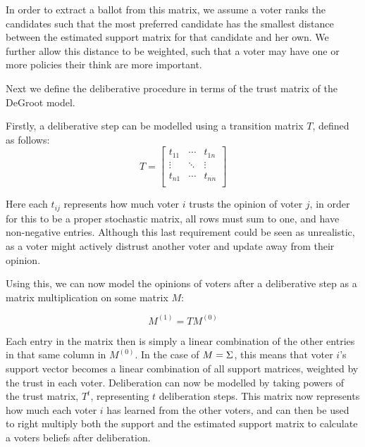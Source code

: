 In order to extract a ballot from this matrix, we assume a voter ranks the
candidates such that the most preferred candidate has the smallest distance
between the estimated support matrix for that candidate and her own. We
further allow this distance to be weighted, such that a voter may have one or
more policies their think are more important.


Next we define the deliberative procedure in terms of the trust matrix of the
DeGroot model.

Firstly, a deliberative step can be modelled using a transition matrix $T$,
defined as follows: \[ T=\begin{bmatrix} t_{11} & \cdots & t_{1n} \\ \vdots &
                \ddots & \vdots          \\ t_{n1} & \cdots  & t_{nn} \\\end{bmatrix} \]

Here each $t_{ij}$ represents how much voter $i$ trusts the opinion of voter
$j$, in order for this to be a proper stochastic matrix, all rows must sum to
one, and have non-negative entries. Although this last requirement could be
seen as unrealistic, as a voter might actively distrust another voter and
update away from their opinion.

Using this, we can now model the opinions of voters after a deliberative step
as a matrix multiplication on some matrix $M$:

\begin{equation} M^{(1)} = TM^{(0)} \label{eq:update_degroot} \end{equation}

Each entry in the matrix then is simply a linear combination of the other
entries in that same column in $M^{(0)}$. In the case of $M = \Sigma$,
this means that voter $i$'s support vector becomes a linear combination of all
support matrices, weighted by the trust in each voter. Deliberation can now be
modelled by taking powers of the trust matrix, $T^{t}$, representing $t$
deliberation steps. This matrix now represents how much each voter $i$ has
learned from the other voters, and can then be used to right multiply both the
support and the estimated support matrix to calculate a voters beliefs after
deliberation.

